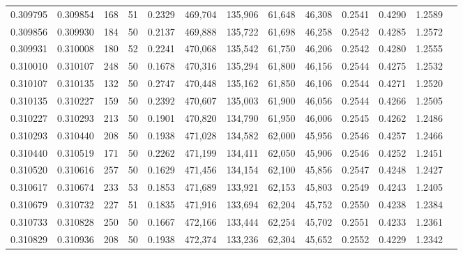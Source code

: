 \begin{tabular}{rrrrrrrrrrrrr}
0.309795 & 0.309854 &   168 &  51 &                                     0.2329 & 469,704 & 135,906 &  61,648 &  46,308 & 0.2541 & 0.4290 & 1.2589 \\
0.309856 & 0.309930 &   184 &  50 &                                     0.2137 & 469,888 & 135,722 &  61,698 &  46,258 & 0.2542 & 0.4285 & 1.2572 \\
0.309931 & 0.310008 &   180 &  52 &                                     0.2241 & 470,068 & 135,542 &  61,750 &  46,206 & 0.2542 & 0.4280 & 1.2555 \\
0.310010 & 0.310107 &   248 &  50 &                                     0.1678 & 470,316 & 135,294 &  61,800 &  46,156 & 0.2544 & 0.4275 & 1.2532 \\
0.310107 & 0.310135 &   132 &  50 &                                     0.2747 & 470,448 & 135,162 &  61,850 &  46,106 & 0.2544 & 0.4271 & 1.2520 \\
0.310135 & 0.310227 &   159 &  50 &                                     0.2392 & 470,607 & 135,003 &  61,900 &  46,056 & 0.2544 & 0.4266 & 1.2505 \\
0.310227 & 0.310293 &   213 &  50 &                                     0.1901 & 470,820 & 134,790 &  61,950 &  46,006 & 0.2545 & 0.4262 & 1.2486 \\
0.310293 & 0.310440 &   208 &  50 &                                     0.1938 & 471,028 & 134,582 &  62,000 &  45,956 & 0.2546 & 0.4257 & 1.2466 \\
0.310440 & 0.310519 &   171 &  50 &                                     0.2262 & 471,199 & 134,411 &  62,050 &  45,906 & 0.2546 & 0.4252 & 1.2451 \\
0.310520 & 0.310616 &   257 &  50 &                                     0.1629 & 471,456 & 134,154 &  62,100 &  45,856 & 0.2547 & 0.4248 & 1.2427 \\
0.310617 & 0.310674 &   233 &  53 &                                     0.1853 & 471,689 & 133,921 &  62,153 &  45,803 & 0.2549 & 0.4243 & 1.2405 \\
0.310679 & 0.310732 &   227 &  51 &                                     0.1835 & 471,916 & 133,694 &  62,204 &  45,752 & 0.2550 & 0.4238 & 1.2384 \\
0.310733 & 0.310828 &   250 &  50 &                                     0.1667 & 472,166 & 133,444 &  62,254 &  45,702 & 0.2551 & 0.4233 & 1.2361 \\
0.310829 & 0.310936 &   208 &  50 &                                     0.1938 & 472,374 & 133,236 &  62,304 &  45,652 & 0.2552 & 0.4229 & 1.2342 \\

\end{tabular}
